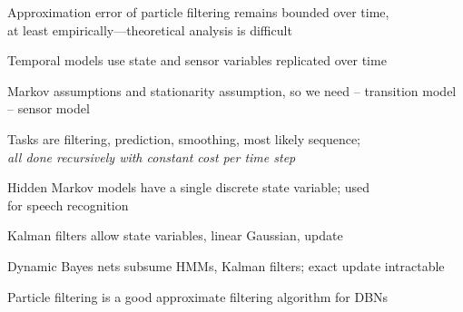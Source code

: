 \documentclass{article}
\begin{document}
\begin{huge}

Approximation error of particle filtering remains bounded over time,\\
at least empirically---theoretical analysis is difficult

\vspace*{0.3in}

\textwidth
{}






Temporal models use state and sensor variables replicated over time

Markov assumptions and stationarity assumption, so we need\al
 -- transition model\al
 -- sensor model 

Tasks are filtering, prediction, smoothing, most likely sequence;\\
\emph{all done recursively with constant cost per time step}


Hidden Markov models have a single discrete state variable; used\\
for speech recognition

Kalman filters allow  state variables, linear Gaussian,  update

Dynamic Bayes nets subsume HMMs, Kalman filters; exact update intractable

Particle filtering is a good approximate filtering algorithm for DBNs



\end{huge} 
\end{document}

